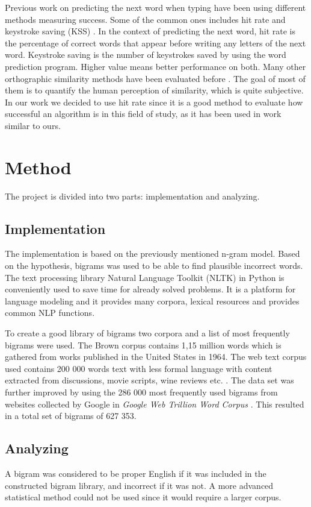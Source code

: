 \documentclass[a4paper,12pt]{article}
\begin{document}
Previous work on predicting the next word when typing have been using different methods measuring success. Some of the common ones includes hit rate and keystroke saving (KSS) \cite{ghayoomi2005word}. In the context of predicting the next word, hit rate is the percentage of correct words that appear before writing any letters of the next word. Keystroke saving is the number of keystrokes saved by using the word prediction program.  Higher value means better performance on both. Many other orthographic similarity methods have been evaluated before \cite{frunza2006automatic}. The goal of most of them is to quantify the human perception of similarity, which is quite subjective. In our work we decided to use hit rate since it is a good method to evaluate how successful an algorithm is in this field of study, as it has been used in work similar to ours. 

\section{Method}
\label{sec:method}
The project is divided into two parts: implementation and analyzing.

\subsection{Implementation}
\label{ref:implementation}
The implementation is based on the previously mentioned n-gram model. Based on the hypothesis, bigrams was used to be able to find plausible incorrect words. The text processing library Natural Language Toolkit (NLTK) in Python is conveniently used to save time for already solved problems. It is a platform for language modeling and it provides many corpora, lexical resources and provides common NLP functions\cite{nltk}. 

To create a good library of bigrams  two corpora and a list of most frequently bigrams were used.  The Brown corpus contains 1,15 million words which is gathered from works published in the United States in 1964\cite{francis64brown}. The web text corpus used contains 200 000 words text with less formal language with content extracted from discussions, movie scripts, wine reviews etc. \cite{nltkWebtext}. The data set was further improved by using the 286 000 most frequently used bigrams from websites collected by Google in \emph{Google Web Trillion Word Corpus} \cite{286}.  This resulted in a total set of bigrams of 627 353. 

\subsection{Analyzing}
\label{ref:analyzing}
A bigram was considered to be proper English if it was included in the constructed bigram library, and incorrect if it was not. A more advanced statistical method could not be used since it would require a larger corpus. 
\end{document}

